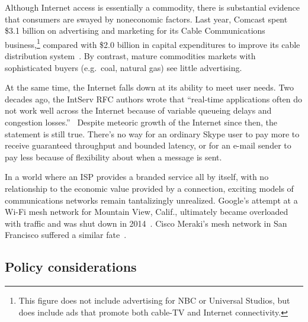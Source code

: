 Although Internet access is essentially a commodity, there is
substantial evidence that consumers are swayed by noneconomic
factors. Last year, Comcast spent \$3.1 billion on advertising and
marketing for its Cable Communications business,\footnote{This figure
  does not include advertising for NBC or Universal Studios, but does
  include ads that promote both cable-TV and Internet connectivity.}
compared with \$2.0 billion in capital expenditures to improve its
cable distribution system~\cite{comcastannualreport}. By contrast,
mature commodities markets with sophisticated buyers (e.g.~coal,
natural gas) see little advertising.

At the same time, the Internet falls down at its ability to meet user
needs. Two decades ago, the IntServ RFC authors wrote that ``real-time
applications often do not work well across the Internet because of
variable queueing delays and congestion losses.''~\cite{rfc1633}
Despite meteoric growth of the Internet since then, the statement is
still true. There's no way for an ordinary Skype user to pay more to receive
guaranteed throughput and bounded latency, or for an e-mail sender to
pay less because of flexibility about when a message is sent.

In a world where an ISP provides a branded service all by itself, with
no relationship to the economic value provided by a connection,
exciting models of communications networks remain tantalizingly
unrealized.  Google's attempt at a Wi-Fi mesh network for Mountain
View, Calif., ultimately became overloaded with traffic and was shut
down in 2014~\cite{pcworld13}. Cisco Meraki's mesh network in San
Francisco suffered a similar fate~\cite{economist14}.

\subsection{Policy considerations}
